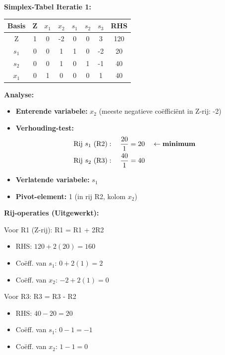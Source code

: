 \documentclass[a4paper,11pt]{article}
\begin{document}
\begin{oefenblok}[title=Lineair Programmeren — De Ambachtelijke Werkplaats]
\textbf{Simplex-Tabel Iteratie 1:}

\vspace{0.3cm}

\begin{center}
\begin{tabular}{|c|c|c|c|c|c|c|c|}
\hline
\textbf{Basis} & \textbf{Z} & \textbf{$x_1$} & \textbf{$x_2$} & \textbf{$s_1$} & \textbf{$s_2$} & \textbf{$s_3$} & \textbf{RHS} \\
\hline
Z & 1 & 0 & -2 & 0 & 0 & 3 & 120 \\
\hline
$s_1$ & 0 & 0 & 1 & 1 & 0 & -2 & 20 \\
\hline
$s_2$ & 0 & 0 & 1 & 0 & 1 & -1 & 40 \\
\hline
$x_1$ & 0 & 1 & 0 & 0 & 0 & 1 & 40 \\
\hline
\end{tabular}
\end{center}
\FloatBarrier

\textbf{Analyse:}
\begin{itemize}
    \item \textbf{Enterende variabele:} $x_2$ (meeste negatieve coëfficiënt in Z-rij: -2)
    \item \textbf{Verhouding-test:}
    \begin{align*}
    \text{Rij } s_1 \text{ (R2)}: \quad \frac{20}{1} &= 20 \quad \leftarrow \text{\textbf{minimum}} \\
    \text{Rij } s_2 \text{ (R3)}: \quad \frac{40}{1} &= 40
    \end{align*}
    \item \textbf{Verlatende variabele:} $s_1$
    \item \textbf{Pivot-element:} 1 (in rij R2, kolom $x_2$)
\end{itemize}

\textbf{Rij-operaties (Uitgewerkt):}

Voor R1 (Z-rij): R1 = R1 + 2R2
\begin{itemize}
    \item RHS: $120 + 2(20) = 160$
    \item Coëff. van $s_1$: $0 + 2(1) = 2$
    \item Coëff. van $x_2$: $-2 + 2(1) = 0$
\end{itemize}

Voor R3: R3 = R3 - R2
\begin{itemize}
    \item RHS: $40 - 20 = 20$
    \item Coëff. van $s_1$: $0 - 1 = -1$
    \item Coëff. van $x_2$: $1 - 1 = 0$
\end{itemize}


\end{oefenblok}
\end{document}
